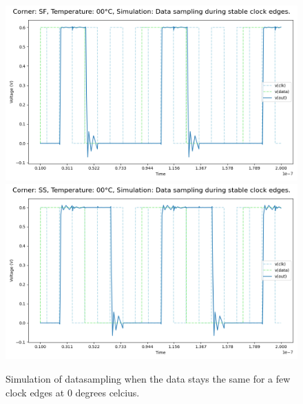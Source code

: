 \begin{figure}[H]
    \vspace{5pt}
    \includegraphics[height= 0.21\textheight]{figures/aimspice/0.600_0.1u_0.1u_0.3u_0.1u/functionality/SF00W2.png}
    \vspace{5pt}
    \includegraphics[height= 0.21\textheight]{figures/aimspice/0.600_0.1u_0.1u_0.3u_0.1u/functionality/SS00W2.png}
    \caption{Simulation of datasampling when the data stays the same for a few clock edges at 0 degrees celcius.}
    \label{fig:aimspice_W2_0}
\end{figure}

\pagebreak


